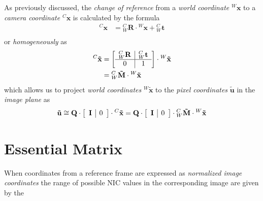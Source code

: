 \par As previously discussed, the \textit{change of reference} from a \textit{world coordinate} ${^W\mathbf{x}}$ to a \textit{camera coordinate} ${^C\mathbf{x}}$ is calculated by the formula
\begin{equation*}
\begin{split}
{^{C}\mathbf{x}}&={^{C}_{W}\mathbf{R}}\cdot{^{W}\mathbf{x}}+{^{C}_{W}\mathbf{t}}\\
\end{split}
\end{equation*}
or \textit{homogeneously} as
\begin{equation*}
\begin{split}
{^{C}\mathbf{\tilde{x}}}&=
\left[\begin{array}{c|c}{^{C}_{W}\mathbf{R}}&{^{C}_{W}\mathbf{t}}\\\hline 0 & 1 \end{array}\right]
\cdot{^{W}\mathbf{\tilde{x}}}\\
&={^C_W\mathbf{\tilde{M}}}\cdot{^W\mathbf{\tilde{x}}}
\end{split}
\end{equation*}
which allows us to project  \textit{world coordinates} ${^W\mathbf{\tilde{x}}}$ to the \textit{pixel coordinates} $\mathbf{\tilde{u}}$ in the \textit{image plane} as
\begin{equation*}
\begin{split}
\mathbf{\tilde{u}}\cong
\mathbf{Q}\cdot\left[\begin{array}{c|c}\mathbf{I} & 0\end{array}\right]\cdot{^C\mathbf{\tilde{x}}}=
\mathbf{Q}\cdot\left[\begin{array}{c|c}\mathbf{I} & 0\end{array}\right]\cdot{^C_W\mathbf{\tilde{M}}}\cdot{^W\mathbf{\tilde{x}}}
\end{split}
\end{equation*}  

\section{Essential Matrix}

\par When coordinates from a reference frame are expressed as \textit{normalized image coordinates} the range of possible NIC values in the corresponding image are given by the 

